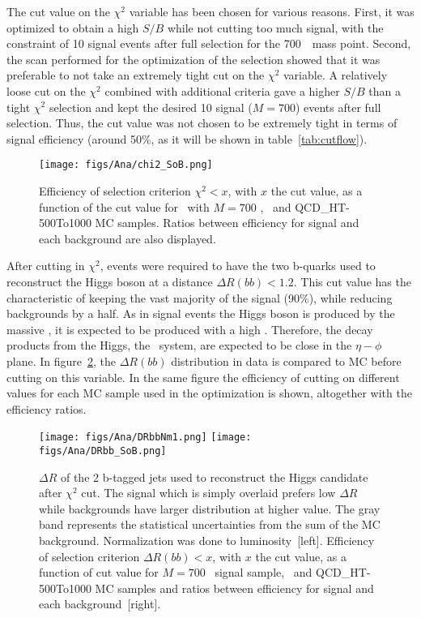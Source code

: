 The cut value on the $\chi^{2}$ variable has been chosen for various reasons. First, it was optimized to obtain a high $S/B$ while not cutting too much signal, with the constraint of 10 signal events after full selection for the 700~\GeVcc~mass point. Second, the scan performed for the optimization of the selection showed that it was preferable to not take an extremely tight cut on the $\chi^{2}$ variable. A relatively loose cut on the $\chi^{2}$ combined with additional criteria gave a higher $S/B$ than a tight $\chi^{2}$ selection and kept the desired 10 signal (${M=700}$\GeVcc) events after full selection.  Thus, the cut value was not chosen to be extremely tight in terms of signal efficiency (around 50\%, as it will be shown in table~\ref{tab:cutflow}).

\begin{figure}[!Hhtbp]
  \begin{center}
    \texttt{[image: figs/Ana/chi2\_SoB.png]}
    \caption{Efficiency of selection criterion $\chi^{2}<x$, with $x$ the cut value, as a function of the cut value for \Tp~with $M=700$ \GeVcc, \ttbar~and QCD\_HT-500To1000 MC samples. Ratios between efficiency for signal and each background are also displayed.}
    \label{fig:chi2cut}
  \end{center}
\end{figure}

After cutting in $\chi^{2}$, events were required to have the two b-quarks used to reconstruct the Higgs boson at a distance $\Delta R(bb)<1.2$. This cut value has the characteristic of keeping the vast majority of the signal (90\%), while reducing backgrounds by a half. As in signal events the Higgs boson is produced by the massive \Tp, it is expected to be produced with a high \pt. Therefore, the decay products from the Higgs, the \bbbar~system, are expected to be close in the $\eta-\phi$ plane. In figure~\ref{fig:DRbb}, the $\Delta R(bb)$ distribution in data is compared to MC before cutting on this variable. In the same figure the efficiency of cutting on different values for each MC sample used in the optimization is shown, altogether with the efficiency ratios. %

\begin{figure}[!Hhtbp]
  \begin{center}
    \texttt{[image: figs/Ana/DRbbNm1.png]}
    \texttt{[image: figs/Ana/DRbb\_SoB.png]}
    \caption{$\Delta R$ of the 2 b-tagged jets used to reconstruct the Higgs candidate after $\chi^{2}$ cut. The signal which is simply overlaid prefers low $\Delta R$ while backgrounds have larger distribution at higher value. The gray band represents the statistical uncertainties from the sum of the MC background. Normalization was done to luminosity~[left]. Efficiency of selection criterion $\Delta R(bb)<x$, with $x$ the cut value, as a function of cut value for $M=700$ \GeVcc~signal sample, \ttbar~and QCD\_HT-500To1000 MC samples and ratios between efficiency for signal and each background~[right].}
    \label{fig:DRbb}
  \end{center}
\end{figure}

